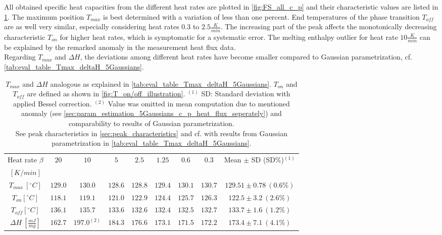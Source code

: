\documentclass{scrartcl}[12pt, halfparskip]
\numberwithin{equation}{section}
\numberwithin{figure}{section}
\numberwithin{table}{section}
\begin{document}
All obtained specific heat capacities from the different heat rates are plotted in \cref{fig:FS_all_c_p} and their characteristic values are listed in \cref{tab:eval_table_Tmax_deltaH_FS}. The maximum position $T_{max}$ is best determined with a variation of less than one percent. End temperatures of the phase transition $T_{off}$ are as well very similar, especially considering heat rates $0.3$ to $2.5 \frac{K}{min}$. The increasing part of the peak affects the monotonically decreasing characteristic $T_{on}$ for higher heat rates, which is symptomatic for a systematic error. The melting enthalpy outlier for heat rate $10 \frac{K}{min}$ can be explained by the remarked anomaly in the measurement heat flux data. \\
Regarding $T_{max}$ and $\Delta H$, the deviations among different heat rates have become smaller compared to Gaussian parametrization, cf. \cref{tab:eval_table_Tmax_deltaH_5Gaussians}.


\begin{table}[H]
	\centering
	\caption{$T_{max}$ and $\Delta H$ analogous as explained in \cref{tab:eval_table_Tmax_deltaH_5Gaussians}. $T_{on}$ and $T_{off}$ are defined as shown in \cref{fig:T_on/off_illustration}. 
	$^{(1)}$ SD: Standard deviation with applied Bessel correction. 
	$^{(2)}$ Value was omitted in mean computation due to mentioned anomaly (see \cref{sec:param_estimation_5Gaussians_c_p_heat_flux_seperately}) and comparability to results of Gaussian parametrization. \\
	See peak characteristics in \cref{sec:peak_characteristics} and cf. with results from Gaussian parametrization in \cref{tab:eval_table_Tmax_deltaH_5Gaussians}.}
	\begin{tabular}{| c | c | c | c | c | c | c | c || c |} \hline
		Heat rate $\beta$ & $20$ & $10$ & $5$ & $2.5$ & $1.25$ & $0.6$ & $0.3$ & Mean $\pm$ SD (SD\%)$^{(1)}$ \\
		$[K/min]$ & & & & & & & & \\ \hline
		$T_{max} \ [^{\circ}C]$ & $129.0$ & $130.0$ & $128.6$ & $128.8$ & $129.4$ & $130.1$ & $130.7$ & $129.51 \pm 0.78 \ (0.6\%)$ \\[0.7ex]
		$T_{on} [^{\circ} C]$ & $118.1$ & $119.1$ & $121.0$ & $122.9$ & $124.4$ & $125.7$ & $126.3$ & $122.5 \pm 3.2 \ (2.6\%)$ \\[0.7ex]
		$T_{off} [^{\circ} C]$ & $136.1$ & $135.7$ & $133.6$ & $132.6$ & $132.4$ & $132.5$ & $132.7$ & $133.7 \pm 1.6 \ (1.2\%)$ \\[0.7ex]
		$\Delta H \ [\frac{mJ}{mg}]$ & $162.7$ & $197.0^{(2)}$ & $184.3$ & $176.6$ & $173.1$ & $171.5$ & $172.2$ & $173.4 \pm 7.1 \ (4.1\%)$ \\ \hline
	\end{tabular}
	\label{tab:eval_table_Tmax_deltaH_FS}
\end{table}
\end{document}
